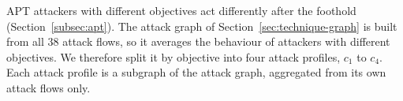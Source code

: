 \documentclass{cshonours}
\begin{document}
APT attackers with different objectives act differently after the foothold
(Section~\ref{subsec:apt}). The attack graph of
Section~\ref{sec:technique-graph} is built from all 38 attack flows, so it
averages the behaviour of attackers with different objectives. We therefore
split it by objective into four attack profiles, $c_1$ to $c_4$. Each attack
profile is a subgraph of the attack graph, aggregated from its own attack
flows only.
\end{document}
